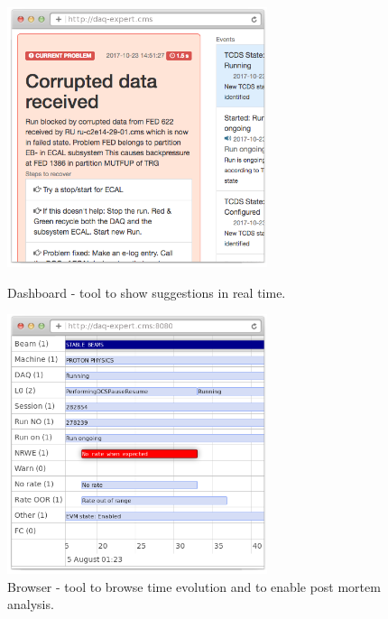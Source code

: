 \documentclass[a4paper]{jpconf}
\begin{document}
\begin{figure}[h]
\begin{minipage}{18pc}
\includegraphics[width=18pc]{tool-dashboard.png}
\caption{\label{dashboard-tool}Dashboard - tool to show suggestions in real time.}
\end{minipage} \hspace{2pc}%
\begin{minipage}{18pc}
\includegraphics[width=18pc]{tool-browser2.png}
\caption{\label{browser-tool}Browser - tool to browse time evolution and to enable post mortem analysis.}
\end{minipage}
\end{figure}
\end{document}
